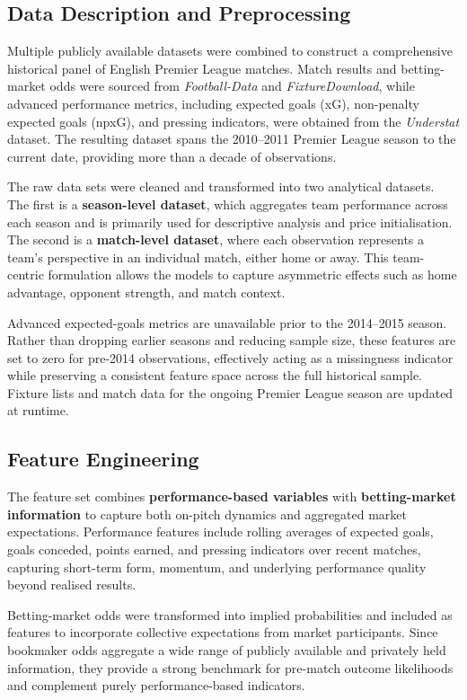 \documentclass[11pt,a4paper]{article}
\begin{document}
\subsection{Data Description and Preprocessing}

Multiple publicly available datasets were combined to construct a comprehensive historical panel of English Premier League matches. Match results and betting-market odds were sourced from \textit{Football-Data} and \textit{FixtureDownload}, while advanced performance metrics, including expected goals (xG), non-penalty expected goals (npxG), and pressing indicators, were obtained from the \textit{Understat} dataset. The resulting dataset spans the 2010–2011 Premier League season to the current date, providing more than a decade of observations.

The raw data sets were cleaned and transformed into two analytical datasets. The first is a \textbf{season-level dataset}, which aggregates team performance across each season and is primarily used for descriptive analysis and price initialisation. The second is a \textbf{match-level dataset}, where each observation represents a team’s perspective in an individual match, either home or away. This team-centric formulation allows the models to capture asymmetric effects such as home advantage, opponent strength, and match context.

Advanced expected-goals metrics are unavailable prior to the 2014–2015 season. Rather than dropping earlier seasons and reducing sample size, these features are set to zero for pre-2014 observations, effectively acting as a missingness indicator while preserving a consistent feature space across the full historical sample. Fixture lists and match data for the ongoing Premier League season are updated at runtime.

\subsection{Feature Engineering}

The feature set combines \textbf{performance-based variables} with \textbf{betting-market information} to capture both on-pitch dynamics and aggregated market expectations. Performance features include rolling averages of expected goals, goals conceded, points earned, and pressing indicators over recent matches, capturing short-term form, momentum, and underlying performance quality beyond realised results.

Betting-market odds were transformed into implied probabilities and included as features to incorporate collective expectations from market participants. Since bookmaker odds aggregate a wide range of publicly available and privately held information, they provide a strong benchmark for pre-match outcome likelihoods and complement purely performance-based indicators.
\end{document}
